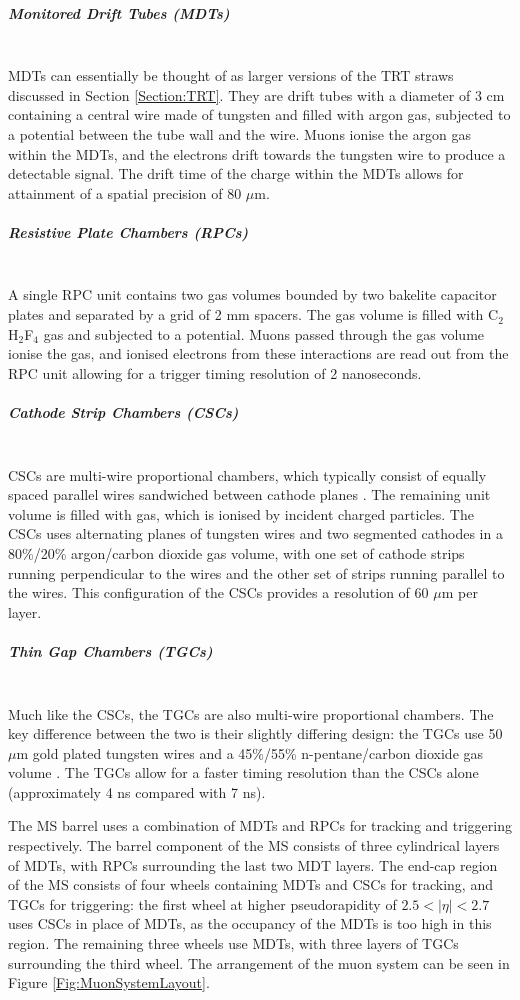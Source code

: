 \documentclass[12pt,a4paper,epsf,portrait,times,epsfig]{article}
\begin{document}
		\subparagraph{Monitored Drift Tubes (MDTs)}\label{Section:MDTs}\mbox{}\\
		MDTs can essentially be thought of as larger versions of the TRT straws discussed in Section \ref{Section:TRT}. They are drift tubes with a diameter of 3 cm containing a central wire made of tungsten and filled with argon gas, subjected to a potential between the tube wall and the wire. Muons ionise the argon gas within the MDTs, and the electrons drift towards the tungsten wire to produce a detectable signal. The drift time of the charge within the MDTs allows for attainment of a spatial precision of 80 $\mu$m.

		\subparagraph{Resistive Plate Chambers (RPCs)}\label{Section:RPCs}\mbox{}\\
		A single RPC unit contains two gas volumes bounded by two bakelite capacitor plates and separated by a grid of 2 mm spacers. The gas volume is filled with C$_{2}$H$_{2}$F$_{4}$ gas and subjected to a potential. Muons passed through the gas volume ionise the gas, and ionised electrons from these interactions are read out from the RPC unit allowing for a trigger timing resolution of 2 nanoseconds. 
		
		\subparagraph{Cathode Strip Chambers (CSCs)}\label{Section:CSCs}\mbox{}\\
		CSCs are multi-wire proportional chambers, which typically consist of equally spaced parallel wires sandwiched between cathode planes \cite{MultiwirePropChamber}. The remaining unit volume is filled with gas, which is ionised by incident charged particles. The CSCs uses alternating planes of tungsten wires and two segmented cathodes in a 80\%/20\% argon/carbon dioxide gas volume, with one set of cathode strips running perpendicular to the wires and the other set of strips running parallel to the wires. This configuration of the CSCs provides a resolution of 60 $\mu$m per layer. 

		\subparagraph{Thin Gap Chambers (TGCs)}\label{Section:TGCs}\mbox{}\\
		Much like the CSCs, the TGCs are also multi-wire proportional chambers. The key difference between the two is their slightly differing design: the TGCs use  50 $\mu$m gold plated tungsten wires and a 45\%/55\% n-pentane/carbon dioxide gas volume \cite{ATLASTGCCertification}. The TGCs allow for a faster timing resolution than the CSCs alone (approximately 4 ns compared with 7 ns). 

		The MS barrel uses a combination of MDTs and RPCs for tracking and triggering respectively. The barrel component of the MS consists of three cylindrical layers of MDTs, with RPCs surrounding the last two MDT layers. The end-cap region of the MS consists of four wheels containing MDTs and CSCs for tracking, and TGCs for triggering: the first wheel at higher pseudorapidity of $2.5 < |\eta| < 2.7$ uses CSCs in place of MDTs, as the occupancy of the MDTs is too high in this region. The remaining three wheels use MDTs, with three layers of TGCs surrounding the third wheel. The arrangement of the muon system can be seen in Figure \ref{Fig:MuonSystemLayout}. 
\end{document}

